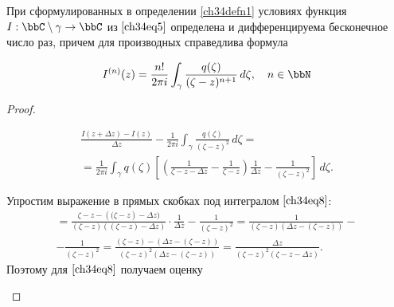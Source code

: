 \begin{thm} \label{ch34Thm2}
При сформулированных в определении \ref{ch34defn1} условиях функция $I:\bbC \setminus \gamma \to \bbC$ из $\eqref{ch34eq5}$ определена и дифференцируема бесконечное число раз, причем для производных справедлива формула

\begin{equation} \label{ch34eq6}
I^{(n)}(z) = \frac{n!}{2\pi i} \int_\gamma \frac{q(\zeta)}{(\zeta - z)^{n+1}}\,d\zeta, \quad n \in \bbN
\end{equation}
\end{thm}
\begin{proof}\leavevmode

\begin{enumerate}

\begin{multline} \label{ch34eq8}
\frac{I(z + \Delta z) - I(z)}{\Delta z} - \frac{1}{2 \pi i} \int_\gamma \frac{q(\zeta)}{(\zeta - z)^2}\,d\zeta=\\ = \frac{1}{2 \pi i} \int_\gamma q(\zeta) \left[ \left( \frac{1}{\zeta - z - \Delta z} - \frac{1}{\zeta - z} \right) \frac{1}{\Delta z} - \frac{1}{(\zeta - z)^2} \right] \,d\zeta.
\end{multline}

Упростим выражение в прямых скобках под интегралом $\eqref{ch34eq8}$:
\begin{multline*}
[\ldots] = \frac{{\zeta} - {z} - ({(\zeta} - {z}) - {\Delta z})}{(\zeta - z)((\zeta - z) - \Delta z)} \cdot \frac{1}{{\Delta z}} - \frac{1}{(\zeta - z)^2} = \frac{1}{(\zeta - z)(\Delta z- (\zeta-z) )} -\\- \frac{1}{(\zeta - z)^2} =
\frac{(\zeta - z)-(\Delta z- (\zeta-z))}{(\zeta - z)^2(\Delta z- (\zeta-z) )}
=\frac{\Delta z}{(\zeta - z)^2 (\zeta - z - \Delta z)} .
\end{multline*}
Поэтому для $\eqref{ch34eq8}$ получаем оценку 


\end{enumerate}
\end{proof}

